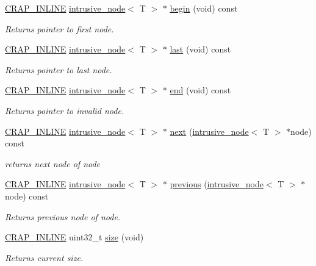 \begin{DoxyCompactItemize}
\hyperlink{config__x86_8h_a5a40526b8d842e7ff731509998bb0f1c}{C\+R\+A\+P\+\_\+\+I\+N\+L\+I\+N\+E} \hyperlink{classcrap_1_1intrusive__node}{intrusive\+\_\+node}$<$ T $>$ $\ast$ \hyperlink{classcrap_1_1intrusive__list_a97c55de8d9c6007cd4a9c9dde4506b68}{begin} (void) const 
\begin{DoxyCompactList}\small\item\em Returns pointer to first node. \end{DoxyCompactList}\item 
\hyperlink{config__x86_8h_a5a40526b8d842e7ff731509998bb0f1c}{C\+R\+A\+P\+\_\+\+I\+N\+L\+I\+N\+E} \hyperlink{classcrap_1_1intrusive__node}{intrusive\+\_\+node}$<$ T $>$ $\ast$ \hyperlink{classcrap_1_1intrusive__list_a104a8be14cebffb5366663b91c5746ce}{last} (void) const 
\begin{DoxyCompactList}\small\item\em Returns pointer to last node. \end{DoxyCompactList}\item 
\hyperlink{config__x86_8h_a5a40526b8d842e7ff731509998bb0f1c}{C\+R\+A\+P\+\_\+\+I\+N\+L\+I\+N\+E} \hyperlink{classcrap_1_1intrusive__node}{intrusive\+\_\+node}$<$ T $>$ $\ast$ \hyperlink{classcrap_1_1intrusive__list_a92df8c8324cf2d4f85122cfde9bb9774}{end} (void) const 
\begin{DoxyCompactList}\small\item\em Returns pointer to invalid node. \end{DoxyCompactList}\item 
\hyperlink{config__x86_8h_a5a40526b8d842e7ff731509998bb0f1c}{C\+R\+A\+P\+\_\+\+I\+N\+L\+I\+N\+E} \hyperlink{classcrap_1_1intrusive__node}{intrusive\+\_\+node}$<$ T $>$ $\ast$ \hyperlink{classcrap_1_1intrusive__list_a62e3ea387cdde54724eeb6119755a17b}{next} (\hyperlink{classcrap_1_1intrusive__node}{intrusive\+\_\+node}$<$ T $>$ $\ast$node) const 
\begin{DoxyCompactList}\small\item\em returns next node of node \end{DoxyCompactList}\item 
\hyperlink{config__x86_8h_a5a40526b8d842e7ff731509998bb0f1c}{C\+R\+A\+P\+\_\+\+I\+N\+L\+I\+N\+E} \hyperlink{classcrap_1_1intrusive__node}{intrusive\+\_\+node}$<$ T $>$ $\ast$ \hyperlink{classcrap_1_1intrusive__list_a0b20fa4f484a8607692d86361053db87}{previous} (\hyperlink{classcrap_1_1intrusive__node}{intrusive\+\_\+node}$<$ T $>$ $\ast$node) const 
\begin{DoxyCompactList}\small\item\em Returns previous node of node. \end{DoxyCompactList}\item 
\hyperlink{config__x86_8h_a5a40526b8d842e7ff731509998bb0f1c}{C\+R\+A\+P\+\_\+\+I\+N\+L\+I\+N\+E} uint32\+\_\+t \hyperlink{classcrap_1_1intrusive__list_ae6b5d7a36c9e347b738be6057467d4e1}{size} (void)
\begin{DoxyCompactList}\small\item\em Returns current size. \end{DoxyCompactList}\end{DoxyCompactItemize}
